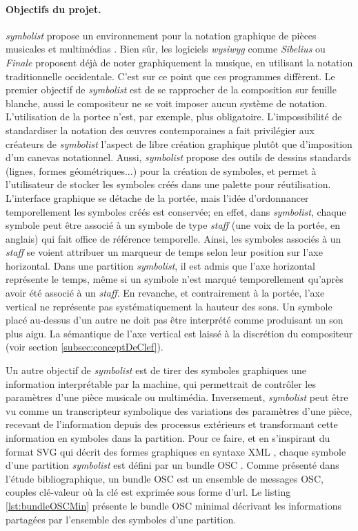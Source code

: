 \paragraph{Objectifs du projet.} \textit{symbolist} propose un environnement pour la notation graphique de pièces musicales et multimédias \cite{gottfried2018}. Bien sûr, les logiciels \textit{wysiwyg} comme \textit{Sibelius} ou \textit{Finale} proposent déjà de noter graphiquement la musique, en utilisant la notation traditionnelle occidentale. C'est sur ce point que ces programmes diffèrent.
Le premier objectif de \textit{symbolist} est de se rapprocher de la composition sur feuille blanche, aussi le compositeur ne se voit imposer aucun système de notation. L'utilisation de la \gls{portee} n'est, par exemple, plus obligatoire.
L'impossibilité de standardiser la notation des œuvres contemporaines a fait privilégier aux créateurs de \textit{symbolist} l'aspect de libre création graphique plutôt que d'imposition d'un canevas notationnel.
Aussi, \textit{symbolist} propose des outils de dessins standards (lignes, formes géométriques...) pour la création de symboles, et permet à l'utilisateur de stocker les symboles créés dans une palette pour réutilisation.
L'interface graphique se détache de la portée, mais l'idée d'ordonnancer temporellement les symboles créés est conservée; en effet, dans \textit{symbolist}, chaque symbole peut être associé à un symbole de type \textit{staff} (une voix de la portée, en anglais) qui fait office de référence temporelle. Ainsi, les symboles associés à un \textit{staff} se voient attribuer un marqueur de temps selon leur position sur l'axe horizontal. Dans une partition \textit{symbolist}, il est admis que l'axe horizontal représente le temps, même si un symbole n'est marqué temporellement qu'après avoir été associé à un \textit{staff}. En revanche, et contrairement à la portée, l'axe vertical ne représente pas systématiquement la hauteur des sons. Un symbole placé au-dessus d'un autre ne doit pas être interprété comme produisant un son plus aigu. La sémantique de l'axe vertical est laissé à la discrétion du compositeur (voir section \ref{subsec:conceptDeClef}).

Un autre objectif de \textit{symbolist} est de tirer des symboles graphiques une information interprétable par la machine, qui permettrait de contrôler les paramètres d'une pièce musicale ou multimédia. Inversement, \textit{symbolist} peut être vu comme un transcripteur symbolique des variations des paramètres d'une pièce, recevant de l'information depuis des processus extérieurs et transformant cette information en symboles dans la partition.   
Pour ce faire, et en s'inspirant du format SVG qui décrit des formes graphiques en syntaxe XML \cite{svg2011}, chaque symbole d'une partition \textit{symbolist} est défini par un bundle OSC \cite{wright2002}. Comme présenté dans l'étude bibliographique, un bundle OSC est un ensemble de messages OSC, couples clé-valeur où la clé est exprimée sous forme d'url.
Le listing \ref{lst:bundleOSCMin} présente le bundle OSC minimal décrivant les informations partagées par l'ensemble des symboles d'une partition.

